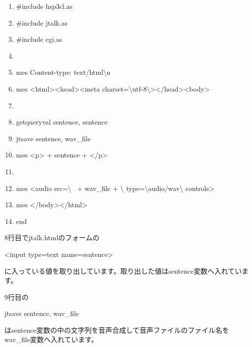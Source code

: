 \centering
\begin{boxedminipage}{\textwidth}
	\begin{enumerate}
	\baselineskip 10pt
	\setlength{\itemsep}{0cm}
	\item \#include {\textquotedbl}hsp3cl.as{\textquotedbl}
	\item\#include {\textquotedbl}jtalk.as{\textquotedbl}
	\item\#include {\textquotedbl}cgi.as{\textquotedbl}
	\item
	\item mes {\textquotedbl}Content-type: text/html{\textbackslash}n{\textquotedbl}
	\item mes {\textquotedbl}{\textless}html{\textgreater}{\textless}head{\textgreater}{\textless}meta
	charset={\textbackslash}{\textquotedbl}utf-8{\textbackslash}{\textquotedbl}{\textgreater}{\textless}/head{\textgreater}{\textless}body{\textgreater}{\textquotedbl}
	\item
	\item getqueryval {\textquotedbl}sentence{\textquotedbl}, sentence
	\item jtsave sentence, wav\_file
	\item mes {\textquotedbl}{\textless}p{\textgreater}{\textquotedbl} + sentence +
	{\textquotedbl}{\textless}/p{\textgreater}{\textquotedbl}
	\item
	\item mes {\textquotedbl}{\textless}audio src={\textbackslash}{\textquotedbl}{\textquotedbl} \ + wav\_file +
	{\textquotedbl}{\textbackslash}{\textquotedbl}
	 type={\textbackslash}{\textquotedbl}audio/wav{\textbackslash}{\textquotedbl} controls{\textgreater}{\textquotedbl}
	\item mes {\textquotedbl}{\textless}/body{\textgreater}{\textless}/html{\textgreater}{\textquotedbl}
	\item end
	\end{enumerate}
\end{boxedminipage}
\flushleft

8行目でjtalk.htmlのフォームの

{\textless}input type={\textquotedbl}text{\textquotedbl} name={\textquotedbl}sentence{\textquotedbl}{\textgreater}

に入っている値を取り出しています。取り出した値はsentence変数へ入れています。

9行目の

jtsave sentence, wav\_file

はsentence変数の中の文字列を音声合成して音声ファイルのファイル名をwav\_file変数へ入れています。


